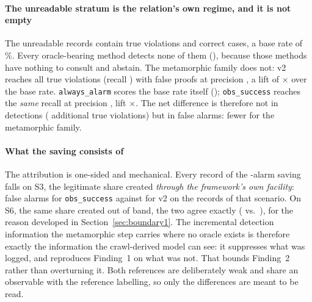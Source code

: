 \paragraph{The unreadable stratum is the relation's own regime, and it is not empty}
The \MiiNOff{} unreadable records contain \MiiOffNBola{} true violations and \MiiOffNNormal{}
correct cases, a base rate of \MiiOffPrevalencePct{}\%. Every oracle-bearing method detects none
of them (\MiiOffVThreeTP{}), because those methods have nothing to consult and abstain. The
metamorphic family does not: v2 reaches all \MiiOffVTwoTP{} true violations (recall
\MiiOffVTwoRec{}) with \MiiOffVTwoFP{} false proofs at precision \MiiOffVTwoPrec{}, a lift of
\MiiLiftVTwo{}$\times$ over the base rate. \texttt{always\_alarm} scores the base rate itself
(\MiiOffAlwaysAlarmPrec{}); \texttt{obs\_success} reaches the \emph{same} recall at precision
\MiiOffObsSuccessPrec{}, lift \MiiLiftObsSuccess{}$\times$. The net difference is therefore not in
detections (\MiiDeltaTPVTwoMinusObsSuccess{} additional true violations) but in false alarms:
\MiiOffAttribSavedFPTotal{} fewer for the metamorphic family.

\paragraph{What the saving consists of}
The attribution is one-sided and mechanical. Every record of the \MiiOffAttribSavedFPTotal{}-alarm
saving falls on S3, the legitimate share created \emph{through the framework's own facility}:
\MiiOffScenThreeObsSuccessFP{} false alarms for \texttt{obs\_success} against
\MiiOffScenThreeVTwoFP{} for v2 on the \MiiOffScenThreeN{} records of that scenario. On S6, the
same share created out of band, the two agree exactly (\MiiOffScenSixObsSuccessFP{}
vs.\ \MiiOffScenSixVTwoFP{}), for the reason developed in Section~\ref{sec:boundary1}. The
incremental detection information the metamorphic step carries where no oracle exists is
therefore exactly the information the crawl-derived model can see: it suppresses what was logged,
and reproduces Finding~1 on what was not. That bounds Finding~2 rather than overturning it. Both
references are deliberately weak and share an observable with the reference labelling, so only
the differences are meant to be read.
